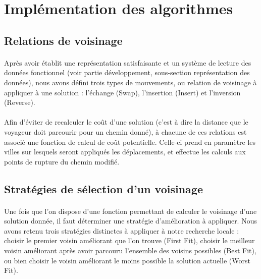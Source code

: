 \documentclass[a4paper,10pt]{report}
\begin{document}
\section{Implémentation des algorithmes}
\subsection{Relations de voisinage}

\paragraph{}
  Après avoir établit une représentation satisfaisante et un système de lecture des données fonctionnel (voir partie
développement, sous-section représentation des données), nous avons défini trois types de mouvements, ou relation de
voisinage à appliquer à une solution : l'échange (Swap), l'insertion (Insert) et l'inversion (Reverse).

\paragraph{}
Afin d'éviter de recalculer le coût d'une solution (c'est à dire la distance que le voyageur doit parcourir
pour un chemin donné), à chacune de ces relations est associé une fonction de calcul de coût potentielle.
Celle-ci prend en paramètre les villes sur lesquels seront appliqués les déplacements, et effectue les calculs
aux points de rupture du chemin modifié.


\subsection{Stratégies de sélection d'un voisinage}

\paragraph{}
  Une fois que l'on dispose d'une fonction permettant de calculer le voisinage d'une solution donnée, il faut déterminer
une stratégie d'amélioration à appliquer. Nous avons retenu trois stratégies distinctes à appliquer à notre recherche
locale : choisir le premier voisin améliorant que l'on trouve (First Fit), choisir le meilleur voisin améliorant après
avoir parcouru l'ensemble des voisins possibles (Best Fit), ou bien choisir le voisin améliorant le moins possible la
solution actuelle (Worst Fit).
\end{document}
